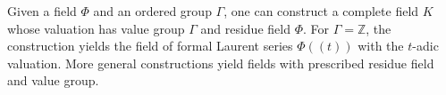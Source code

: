 Given a field $\Phi$ and an ordered group $\Gamma$, one can construct a complete field $K$ whose valuation has value group $\Gamma$ and residue field $\Phi$. For $\Gamma = \mathbb{Z}$, the construction yields the field of formal Laurent series $\Phi((t))$ with the $t$-adic valuation. More general constructions yield fields with prescribed residue field and value group.
